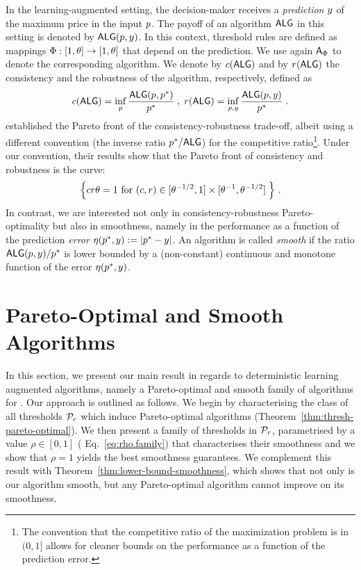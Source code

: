 In the learning-augmented setting, the decision-maker receives a {\em prediction} $y$ of the maximum price in the input $p$. The payoff of an algorithm $\mbox{\textup{\textsf{ALG}}}$ in this setting is denoted by $\mbox{\textup{\textsf{ALG}}}(p, y)$.
In this context, threshold rules are defined as mappings $\Phi: [1, \theta] \to [1, \theta]$ that depend on the prediction. We use again $\mbox{\textup{\textsf{A}}}_\Phi$ to denote the corresponding algorithm.
We denote by $c(\mbox{\textup{\textsf{ALG}}})$ and by $r(\mbox{\textup{\textsf{ALG}}})$ the consistency and the robustness of the algorithm, respectively, defined as
\[
c(\mbox{\textup{\textsf{ALG}}}) = \inf_{p} \frac{\mbox{\textup{\textsf{ALG}}}(p, p^*)}{p^*} \;,
\;
r(\mbox{\textup{\textsf{ALG}}}) = \inf_{p,y} \frac{\mbox{\textup{\textsf{ALG}}}(p, y)}{p^*} \;.
\]
\citet{sun_pareto-optimal_2021} established the Pareto front of the consistency-robustness trade-off, albeit using a different convention (the inverse ratio $p^*/\mbox{\textup{\textsf{ALG}}}$) for the competitive ratio\footnote{The convention that the competitive ratio of the maximization problem is in $(0,1]$ allows for cleaner bounds on the performance as a function of the prediction error.}. Under our convention, their results show that the Pareto front of consistency and robustness is  the curve:
\begin{align}\label{eq:pareto_optimal_front}
    \left\{c r \theta=1 \text{ for }
    (c, r) \in [\theta^{-1/2},1]\times [\theta^{-1},\theta^{-1/2}] \;
     \right\}\,.
\end{align}
In contrast, we are interested not only in consistency-robustness Pareto-optimality but also in smoothness, namely in the performance as a function of the prediction {\em error} $\eta(p^*, y):= |p^* - y|$. An algorithm is called {\em smooth} if the ratio 
$\mbox{\textup{\textsf{ALG}}}(p,y)/{p^*}$ is lower bounded by a (non-constant) continuous and monotone function of the error $\eta(p^*,y)$.



\section{Pareto-Optimal and Smooth Algorithms}\label{sec: deterministic predictions}


In this section, we present our main result in regards to deterministic learning augmented algorithms, namely a Pareto-optimal and smooth family of algorithms for \OMS{}.
Our approach is outlined as follows. We begin by characterising the class of all thresholds $\mathcal{P}_r$ which induce Pareto-optimal algorithms (Theorem~\ref{thm:thresh-pareto-optimal}). We then present a family of thresholds in $\mathcal{P}_r$, parametrised by a value $\rho\in [0,1]$ ( Eq.~\eqref{eq:rho.family}) that characterises their smoothness
and we show that $\rho = 1$ yields the best smoothness guarantees.
We complement this result with Theorem~\ref{thm:lower-bound-smoothness}, which shows that not only is our algorithm smooth, but any Pareto-optimal algorithm cannot improve on its smoothness.



